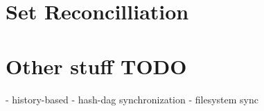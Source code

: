 \section{Set Reconcilliation}

\section{Other stuff TODO}

- history-based
- hash-dag synchronization
- filesystem sync

%
%
%
%
%
